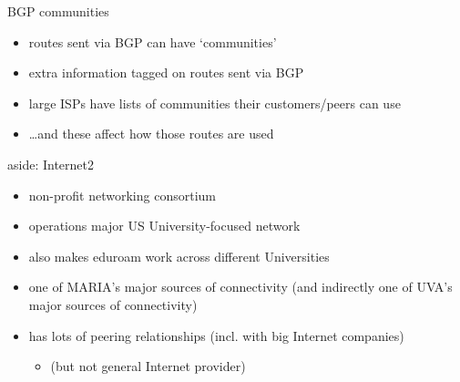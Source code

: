 \begin{frame}{BGP communities}
    \begin{itemize}
    \item routes sent via BGP can have `communities'
    \item extra information tagged on routes sent via BGP
    \vspace{.5cm}
    \item large ISPs have lists of communities their customers/peers can use
    \item \ldots and these affect how those routes are used
    \end{itemize}
\end{frame}

\begin{frame}{aside: Internet2}
    \begin{itemize}
    \item non-profit networking consortium
    \item operations major US University-focused network
    \item also makes eduroam work across different Universities
    \item one of MARIA's major sources of connectivity (and indirectly one of UVA's major sources of connectivity)
    \item has lots of peering relationships (incl. with big Internet companies)
        \begin{itemize}
        \item (but not general Internet provider)
        \end{itemize}
    \end{itemize}
\end{frame}

